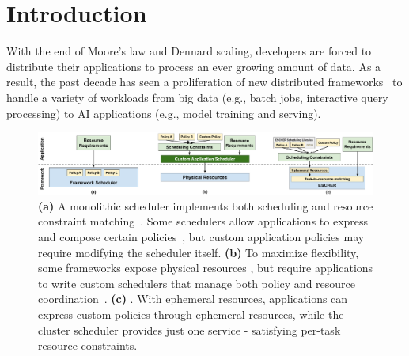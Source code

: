 \section{Introduction}
\label{sec:escher_intro}

With the end of Moore’s law and Dennard scaling, developers are forced to distribute their applications to process an ever growing amount of data. As a result, the past decade has seen a proliferation of new distributed frameworks~\cite{kubernetes, ray, mesos} to handle a variety of workloads from big data (e.g., batch jobs, interactive query processing) to AI applications (e.g., model training and serving).


\begin{figure}[ht]
\centering
\includegraphics[width=0.92\linewidth]{escher/figures/escher-compare-arch.pdf}
\caption{\small
\textbf{(a)} A monolithic scheduler implements both scheduling and resource constraint matching~\cite{ghodsi2011dominant,isard2009quincy,mpi,kubernetes}. Some schedulers allow applications to express and compose certain policies~\cite{condor,tetrisched,kubernetes}, but custom application policies may require modifying the scheduler itself.
\textbf{(b)} To maximize flexibility, some frameworks expose physical resources \cite{mesos, omega}, but require applications to write custom schedulers that manage both policy and resource coordination~\cite{gandiva,DevinMasters,mapreduce}.
\textbf{(c)} \name{}. With ephemeral resources, applications can express custom policies through ephemeral resources, while the cluster scheduler provides just one service - satisfying per-task resource constraints.
}
\label{fig:scheduler-architectures-new}
\vspace{-2mm}
\end{figure}

